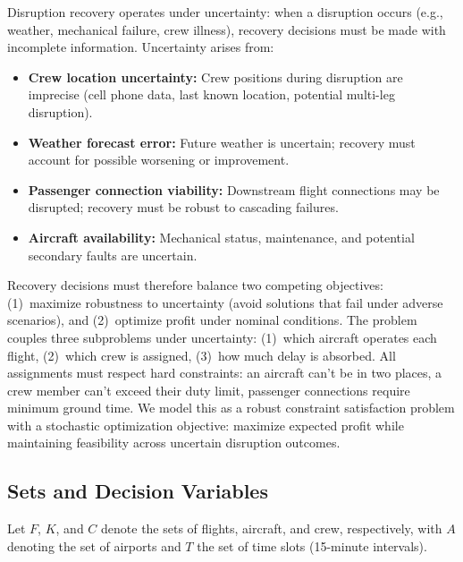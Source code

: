\documentclass[12pt,number]{elsarticle}
\begin{document}
Disruption recovery operates under uncertainty: when a disruption occurs (e.g., weather, mechanical failure, crew illness), recovery decisions must be made with incomplete information. Uncertainty arises from:

\begin{itemize}
    \item \textbf{Crew location uncertainty:} Crew positions during disruption are imprecise (cell phone data, last known location, potential multi-leg disruption).
    \item \textbf{Weather forecast error:} Future weather is uncertain; recovery must account for possible worsening or improvement.
    \item \textbf{Passenger connection viability:} Downstream flight connections may be disrupted; recovery must be robust to cascading failures.
    \item \textbf{Aircraft availability:} Mechanical status, maintenance, and potential secondary faults are uncertain.
\end{itemize}

Recovery decisions must therefore balance two competing objectives: (1)~maximize robustness to uncertainty (avoid solutions that fail under adverse scenarios), and (2)~optimize profit under nominal conditions. The problem couples three subproblems under uncertainty: (1)~which aircraft operates each flight, (2)~which crew is assigned, (3)~how much delay is absorbed. All assignments must respect hard constraints: an aircraft can't be in two places, a crew member can't exceed their duty limit, passenger connections require minimum ground time. We model this as a robust constraint satisfaction problem with a stochastic optimization objective: maximize expected profit while maintaining feasibility across uncertain disruption outcomes.

\subsection{Sets and Decision Variables}

Let $F$, $K$, and $C$ denote the sets of flights, aircraft, and crew, respectively, with $A$ denoting the set of airports and $T$ the set of time slots (15-minute intervals).
\end{document}
